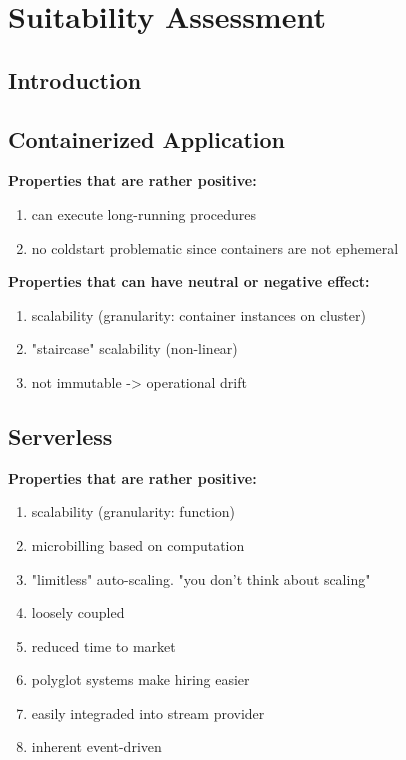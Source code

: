 \chapter{Suitability Assessment}\label{chp:suitabilityAssessment}


\section{Introduction}


\section{Containerized Application}

\textbf{Properties that are rather positive:}
\begin{enumerate}
    \item can execute long-running procedures
    \item no coldstart problematic since containers are not ephemeral
\end{enumerate}

\textbf{Properties that can have neutral or negative effect:}
\begin{enumerate}
    \item scalability (granularity: container instances on cluster)
    \item "staircase" scalability (non-linear)
    \item not immutable -> operational drift
\end{enumerate}

\section{Serverless}

\textbf{Properties that are rather positive:}
\begin{enumerate}
    \item scalability (granularity: function)
    \item microbilling based on computation
    \item "limitless" auto-scaling. "you don't think about scaling"
    \item loosely coupled
    \item reduced time to market
    \item polyglot systems make hiring easier
    \item easily integraded into stream provider
    \item inherent event-driven
\end{enumerate}


